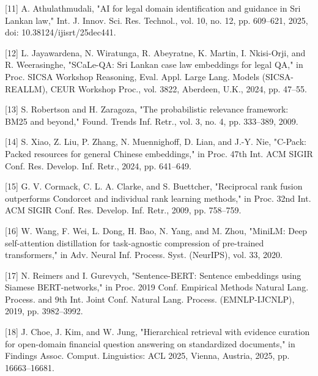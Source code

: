 \documentclass[12pt,a4paper]{article}
\begin{document}
\hangindent=0.35in  \textnormal{[11]} A. Athulathmudali, "AI for legal domain identification and guidance in Sri Lankan law," Int. J. Innov. Sci. Res. Technol., vol. 10, no. 12, pp. 609–621, 2025, doi: 10.38124/ijisrt/25dec441.\par

\hangindent=0.35in  \textnormal{[12]} L. Jayawardena, N. Wiratunga, R. Abeyratne, K. Martin, I. Nkisi-Orji, and R. Weerasinghe, "SCaLe-QA: Sri Lankan case law embeddings for legal QA," in Proc. SICSA Workshop Reasoning, Eval. Appl. Large Lang. Models (SICSA-REALLM), CEUR Workshop Proc., vol. 3822, Aberdeen, U.K., 2024, pp. 47–55.\par

\hangindent=0.35in  \textnormal{[13]} S. Robertson and H. Zaragoza, "The probabilistic relevance framework: BM25 and beyond," Found. Trends Inf. Retr., vol. 3, no. 4, pp. 333–389, 2009.\par

\hangindent=0.35in  \textnormal{[14]} S. Xiao, Z. Liu, P. Zhang, N. Muennighoff, D. Lian, and J.-Y. Nie, "C-Pack: Packed resources for general Chinese embeddings," in Proc. 47th Int. ACM SIGIR Conf. Res. Develop. Inf. Retr., 2024, pp. 641–649.\par

\hangindent=0.35in  \textnormal{[15]} G. V. Cormack, C. L. A. Clarke, and S. Buettcher, "Reciprocal rank fusion outperforms Condorcet and individual rank learning methods," in Proc. 32nd Int. ACM SIGIR Conf. Res. Develop. Inf. Retr., 2009, pp. 758–759.\par

\hangindent=0.35in  \textnormal{[16]} W. Wang, F. Wei, L. Dong, H. Bao, N. Yang, and M. Zhou, "MiniLM: Deep self-attention distillation for task-agnostic compression of pre-trained transformers," in Adv. Neural Inf. Process. Syst. (NeurIPS), vol. 33, 2020.\par

\hangindent=0.35in  \textnormal{[17]} N. Reimers and I. Gurevych, "Sentence-BERT: Sentence embeddings using Siamese BERT-networks," in Proc. 2019 Conf. Empirical Methods Natural Lang. Process. and 9th Int. Joint Conf. Natural Lang. Process. (EMNLP-IJCNLP), 2019, pp. 3982–3992.\par

\hangindent=0.35in  \textnormal{[18]} J. Choe, J. Kim, and W. Jung, "Hierarchical retrieval with evidence curation for open-domain financial question answering on standardized documents," in Findings Assoc. Comput. Linguistics: ACL 2025, Vienna, Austria, 2025, pp. 16663–16681.\par
\end{document}
